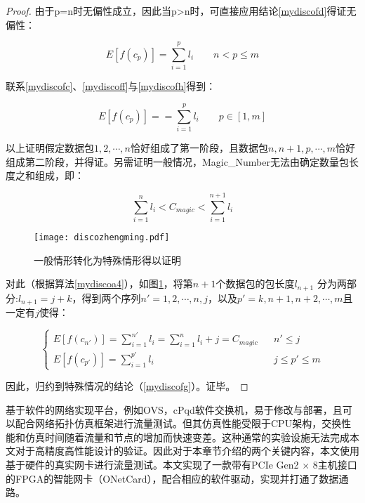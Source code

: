 \begin{proof}
	由于p=n时无偏性成立，因此当p>n时，可直接应用结论\ref{mydiscofd}得证无偏性：
	
	\begin{equation} \label{mydiscofh}
	E[f(c_p)]  = \sum_{i=1}^{p}l_i \quad\quad n<p\leq m
	\end{equation}
	
	联系\ref{mydiscofc}、\ref{mydiscoff}与\ref{mydiscofh}得到：
	
	\begin{equation} \label{mydiscofg}
	E[f(c_p)]==\sum_{i=1}^{p}l_i\quad\quad p \in [1,m]
	\end{equation}
	
	以上证明假定数据包$ 1,2,\cdots,n $恰好组成了第一阶段，且数据包$ n,n+1,p,\cdots,m $恰好组成第二阶段，并得证。另需证明一般情况，Magic\_Number无法由确定数量包长度之和组成，即：
	
	\begin{equation} \label{mydiscofi}
	\sum_{i=1}^{n}l_i < C_{magic} < \sum_{i=1}^{n+1}l_i
	\end{equation}
	
	\begin{figure}[!ht]
		\centering 
	\vspace{-1.5mm}
		\texttt{[image: discozhengming.pdf]}
		\caption{一般情形转化为特殊情形得以证明} \label{fig:discozhengming}
	\end{figure}
	
	对此（根据算法\ref{mydiscoa4}），如图\ref{fig:discozhengming}，将第$ n+1 $个数据包的包长度$ l_{n+1} $ 分为两部分:$ l_{n+1}=j+k $，得到两个序列$ n'=1,2,\cdots,n,j $，以及$ p'=k,n+1,n+2,\cdots,m $且一定有$ j $使得：
	
	\begin{equation} \label{mydiscofk}
	\left\{
	\begin{array}{rcl}
	E[f(c_{n'})]=\sum_{i=1}^{n'}l_i=\sum_{i=1}^{n}l_i+j=C_{magic}         &      & {n' \leq j} \\
	E[f(c_{p'})] =\sum_{i=1}^{p'} l_i     &      & {j\leq p' \leq m}
	\end{array} \right. 
	\end{equation}
	
	因此，归约到特殊情况的结论（\ref{mydiscofg}）。证毕。
\end{proof}

 \label{chap36}

基于软件的网络实现平台，例如OVS，cPqd软件交换机，易于修改与部署，且可以配合网络拓扑仿真框架进行流量测试。但其仿真性能受限于CPU架构，交换性能和仿真时间随着流量和节点的增加而快速变差。这种通常的实验设施无法完成本文对于高精度高性能设计的验证。因此对于本章节介绍的两个关键内容，本文使用基于硬件的真实网卡进行流量测试。本文实现了一款带有PCIe Gen2 $ \times $ 8主机接口的FPGA的智能网卡（ONetCard），配合相应的软件驱动，实现并打通了数据通路。

